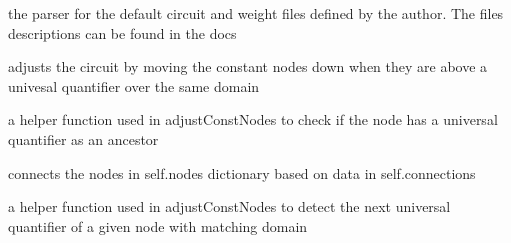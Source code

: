 \documentclass[letterpaper,10pt,english]{sphinxmanual}
\begin{document}
\begin{fulllineitems}
\label{\detokenize{index:parser.Parser}}
the parser for the default circuit and weight files defined by the author. The files descriptions can be found in the docs

\begin{fulllineitems}
\label{\detokenize{index:parser.Parser.adjustConstNodes}}
adjusts the circuit by moving the constant nodes down when they are above a univesal quantifier over the same domain

\end{fulllineitems}


\begin{fulllineitems}
\label{\detokenize{index:parser.Parser.ancestorIsForAll}}
a helper function used in adjustConstNodes to check if the node has a universal quantifier as an ancestor

\end{fulllineitems}


\begin{fulllineitems}
\label{\detokenize{index:parser.Parser.connectNodes}}
connects the nodes in self.nodes dictionary based on data in self.connections

\end{fulllineitems}


\begin{fulllineitems}
\label{\detokenize{index:parser.Parser.nextMatchingForAll}}
a helper function used in adjustConstNodes to detect the next universal quantifier of a given node with matching domain


\end{fulllineitems}
\end{fulllineitems}
\end{document}
